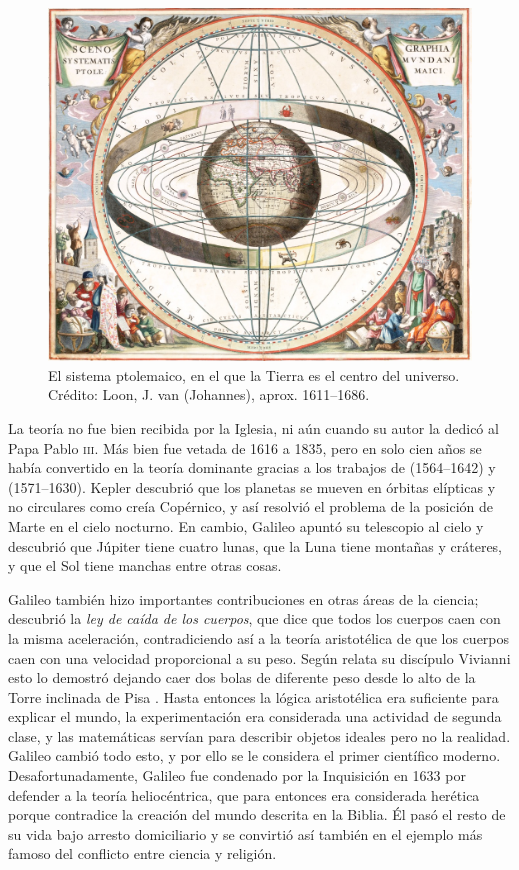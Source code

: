 \begin{figure}[ht]
    \centering
    \includegraphics[width=0.8\linewidth]{img/Cellarius_ptolemaic_system}
    \caption{El sistema ptolemaico, en el que la Tierra es el centro del
        universo. Crédito: Loon, J. van (Johannes), aprox. 1611--1686.}
    \label{fig:ptolemaico}
\end{figure}

La teoría no fue bien recibida por la Iglesia, ni aún cuando su autor la dedicó
al Papa Pablo \textsc{iii}.
Más bien fue vetada de 1616 a 1835, pero en solo cien años se había convertido
en la teoría dominante gracias a los trabajos de  (1564--1642) y 
(1571--1630).
Kepler descubrió que los planetas se mueven en órbitas elípticas y no circulares
como creía Copérnico, y así resolvió el problema de la posición de Marte en el
cielo nocturno.
En cambio, Galileo apuntó su telescopio al cielo y descubrió que Júpiter tiene
cuatro lunas, que la Luna tiene montañas y cráteres, y que el Sol tiene manchas
entre otras cosas.

Galileo también hizo importantes contribuciones en otras áreas de la ciencia;
descubrió la \emph{ley de caída de los cuerpos}, que dice que todos los cuerpos
caen con la misma aceleración, contradiciendo así a la teoría aristotélica de
que los cuerpos caen con una velocidad proporcional a su peso.
Según relata su discípulo Vivianni esto lo demostró dejando caer dos bolas de
diferente peso desde lo alto de la Torre inclinada de Pisa
\cite{Viviani+2019+1+94}.
Hasta entonces la lógica aristotélica era suficiente para explicar el mundo, la
experimentación era considerada una actividad de segunda clase, y las
matemáticas servían para describir objetos ideales pero no la realidad.
Galileo cambió todo esto, y por ello se le considera el primer científico
moderno.
Desafortunadamente, Galileo fue condenado por la Inquisición en 1633 por
defender a la teoría heliocéntrica, que para entonces era considerada herética
porque contradice la creación del mundo descrita en la Biblia.
Él pasó el resto de su vida bajo arresto domiciliario y se convirtió así también
en el ejemplo más famoso del conflicto entre ciencia y religión.


